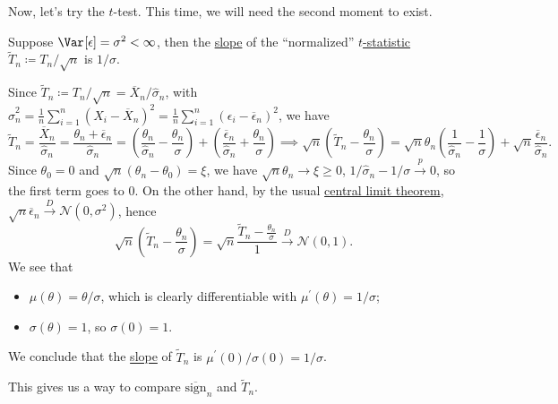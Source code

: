 Now, let's try the \(t\)-test. This time, we will need the second moment to exist.

\begin{eg}[\(t\)-test]
	Suppose \(\Var_{}[\epsilon ] = \sigma ^2 < \infty \), then the \hyperref[def:slope]{slope} of the ``normalized'' \hyperref[def:t-statistic]{\(t\)-statistic} \(\widetilde{T} _n \coloneqq T_n / \sqrt{n}\) is \(1 / \sigma \).
\end{eg}
\begin{explanation}
	Since \(\widetilde{T} _n \coloneqq T_n / \sqrt{n} = \overline{X} _n / \hat{\sigma} _n\), with \(\hat{\sigma} _n^2 = \frac{1}{n} \sum_{i=1}^{n} (X_i - \overline{X} _n)^2 = \frac{1}{n} \sum_{i=1}^{n} (\epsilon _i - \overline{\epsilon} _n)^2\), we have
	\[
		\widetilde{T} _n
		= \frac{\overline{X} _n}{\hat{\sigma} _n}
		= \frac{\theta _n + \overline{\epsilon} _n}{\hat{\sigma} _n}
		= \left( \frac{\theta _n}{\hat{\sigma} _n} - \frac{\theta _n}{\sigma } \right) + \left( \frac{\overline{\epsilon} _n}{\hat{\sigma} _n} + \frac{\theta _n}{\sigma } \right)
		\implies
		\sqrt{n} \left( \widetilde{T} _n - \frac{\theta _n}{\sigma } \right)
		= \sqrt{n} \theta _n \left( \frac{1}{\hat{\sigma} _n} - \frac{1}{\sigma } \right) + \sqrt{n} \frac{\overline{\epsilon} _n}{\hat{\sigma} _n}.
	\]
	Since \(\theta _0 = 0\) and \(\sqrt{n} (\theta _n - \theta _0) = \xi \), we have \(\sqrt{n} \theta _n \to \xi \geq 0\), \(1 / \hat{\sigma} _n - 1 / \sigma \overset{p}{\to} 0\), so the first term goes to \(0\). On the other hand, by the usual \hyperref[thm:CLT]{central limit theorem}, \(\sqrt{n} \overline{\epsilon} _n \overset{D}{\to} \mathcal{N} (0, \sigma ^2)\), hence
	\[
		\sqrt{n} \left( \widetilde{T} _n - \frac{\theta _n}{\sigma } \right)
		= \sqrt{n} \frac{\widetilde{T} _n - \frac{\theta _n}{\sigma }}{1}
		\overset{D}{\to} \mathcal{N} (0, 1).
	\]
	We see that
	\begin{itemize}
		\item \(\mu (\theta ) = \theta / \sigma \), which is clearly differentiable with \(\mu ^{\prime} (\theta ) = 1 / \sigma \);
		\item \(\sigma (\theta ) = 1\), so \(\sigma (0) = 1\).
	\end{itemize}
	We conclude that the \hyperref[def:slope]{slope} of \(\widetilde{T} _n\) is \(\mu ^{\prime} (0) / \sigma (0) = 1 / \sigma \).
\end{explanation}

This gives us a way to compare \(\overline{\mathrm{sign} }_n \) and \(\widetilde{T} _n\).

